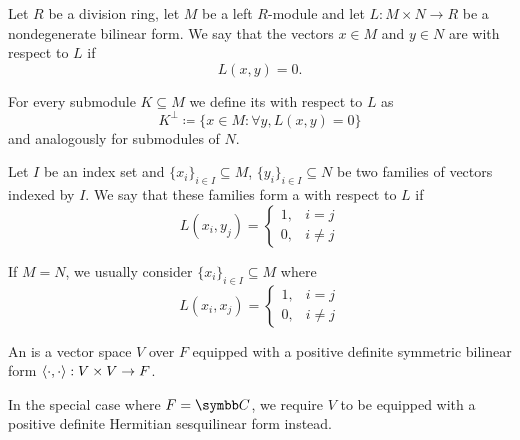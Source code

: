 \begin{definition}\label{def:orthogonality}
  Let \( R \) be a division ring, let \( M \) be a left \( R \)-module and let \( L: M \times N \to R \) be a nondegenerate bilinear form. We say that the vectors \( x \in M \) and \( y \in N \) are  with respect to \( L \) if
  \begin{equation*}
    L(x, y) = 0.
  \end{equation*}

  For every submodule \( K \subseteq M \) we define its  with respect to \( L \) as
  \begin{equation*}
    K^\perp \coloneqq \{ x \in M \colon \forall y, L(x, y) = 0 \}
  \end{equation*}
  and analogously for submodules of \( N \).

  Let \( I \) be an index set and \( \{ x_i \}_{i \in I} \subseteq M \), \( \{ y_i \}_{i \in I} \subseteq N \) be two families of vectors indexed by \( I \). We say that these families form a  with respect to \( L \) if
  \begin{equation*}
    L(x_i, y_j) = \begin{cases}
      1, &i = j \\
      0, &i \neq j
    \end{cases}
  \end{equation*}

  If \( M = N \), we usually consider  \( \{ x_i \}_{i \in I} \subseteq M \) where
  \begin{equation*}
    L(x_i, x_j) = \begin{cases}
      1, &i = j \\
      0, &i \neq j
    \end{cases}
  \end{equation*}
\end{definition}

\begin{definition}\label{def:inner_product_space}
  An  is a vector space \( V \) over \( F \) equipped with a positive definite symmetric bilinear form \( \left\langle \cdot, \cdot \right\rangle: V \times V \to F \).

  In the special case where \( F = \BB{C} \), we require \( V \) to be equipped with a positive definite Hermitian sesquilinear form instead.
\end{definition}

